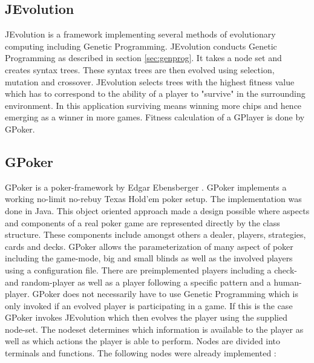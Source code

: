 \documentclass[12pt,fleqn,a4paper]{article}
\begin{document}
\subsection{JEvolution}
JEvolution is a framework implementing several methods of evolutionary computing including Genetic Programming. JEvolution
conducts Genetic Programming as described in section \ref{sec:genprog}. It takes a node set and creates syntax trees. These
syntax trees are then evolved using selection, mutation and crossover. JEvolution selects trees with the highest fitness value which has to correspond to the ability of a player to "survive" in the surrounding environment.
In this application surviving means winning more chips and hence emerging as a winner in more games. Fitness calculation of a GPlayer is done by GPoker. 

\label{gpocker}
\subsection{GPoker}
GPoker is a poker-framework by Edgar Ebensberger \cite{GPoker}. GPoker implements a working no-limit no-rebuy Texas Hold'em poker setup. The implementation was done in Java. This object oriented approach made a design possible where aspects and components of a real poker game are represented directly by the class structure. These components include amongst others a dealer, players, strategies, cards and decks. GPoker allows the parameterization of many aspect of poker including the game-mode, big and small blinds as well as the involved players using a configuration file. There are preimplemented players including a check- and random-player as well as a player following a specific pattern and a human-player.
GPoker does not necessarily have to use Genetic Programming which is only invoked if an evolved player is participating in a game.
If this is the case GPoker invokes JEvolution which then evolves the player using the supplied node-set. The nodeset determines which information is available to the player as well as which actions the player is able to perform. Nodes are divided into terminals and functions. The following nodes were already implemented \cite{GPoker}:
\label{sec:nodes}
\end{document}
